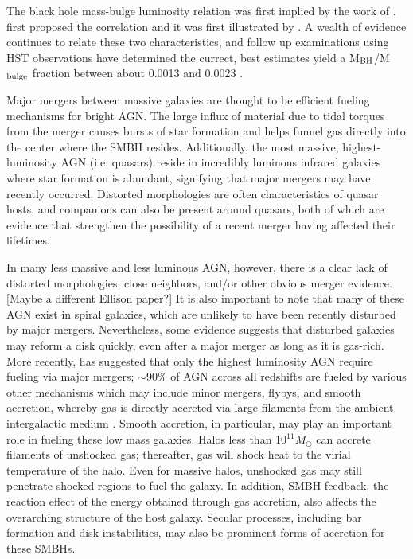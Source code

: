 \documentclass[12pt,headA,chapB]{fiskthesis}
\begin{document}

The black hole mass-bulge luminosity relation was first implied by the work of \cite{Dressler1988}. \cite{Dressler1989} first proposed the correlation and it was first illustrated by \cite{Kormendy1993}. A wealth of evidence continues to relate these two characteristics, and follow up examinations using HST observations have determined the currect, best estimates yield a M$_{\rm BH}$/M$_{\rm bulge}$ fraction between about 0.0013 and 0.0023 \citep{Merritt2001a,McLure2001,Marconi2003}. 

Major mergers between massive galaxies are thought to be efficient fueling mechanisms for bright AGN. The large influx of material due to tidal torques from the merger causes bursts of star formation and helps funnel gas directly into the center where the SMBH resides. \citep{Richards2006,Reddy2008,Hopkins2010} Additionally, the most massive, highest-luminosity AGN (i.e. quasars) reside in incredibly luminous infrared galaxies where star formation is abundant, signifying that major mergers may have recently occurred. \citep{Treister2012} Distorted morphologies are often characteristics of quasar hosts, and companions can also be present around quasars, both of which are evidence that strengthen the possibility of a recent merger having affected their lifetimes. 

In many less massive and less luminous AGN, however, there is a clear lack of distorted morphologies, close neighbors, and/or other obvious merger evidence.  \citep{Ryan2007,Schawinski2011,Ellison2013,Hicks2013}[Maybe a different Ellison paper?] It is also important to note that many of these AGN exist in spiral galaxies, which are unlikely to have been recently disturbed by major mergers. \citep[Which 1990's Tremaine?]{Springel2005,Kocevski2011} Nevertheless, some evidence suggests \citep{vanGorkom1997,Governato2009} that disturbed galaxies may reform a disk quickly, even after a major merger as long as it is gas-rich. More recently, \cite{Treister2012} has suggested that only the highest luminosity AGN require fueling via major mergers; $\sim$90\% of AGN across all redshifts are fueled by various other mechanisms which may include minor mergers, flybys, and smooth accretion, whereby gas is directly accreted via large filaments from the ambient intergalactic medium \citep{Cox2006,Bellovary2013,Sinha2012}. 
Smooth accretion, in particular, may play an important role in fueling these low mass galaxies. Halos less than 10$^{11} M_{\odot}$ can accrete filaments of unshocked gas; thereafter, gas will shock heat to the virial temperature of the halo. \citep{Keres2005} Even for massive halos, unshocked gas may still penetrate shocked regions to fuel the galaxy. \citep{Brooks2007,Dekel2009,Nelson2013} In addition, SMBH feedback, the reaction effect of the energy obtained through gas accretion, also affects the overarching structure of the host galaxy. Secular processes, including bar formation and disk instabilities, may also be prominent forms of accretion for these SMBHs. \citep{Kormendy2013}  
\end{document}
